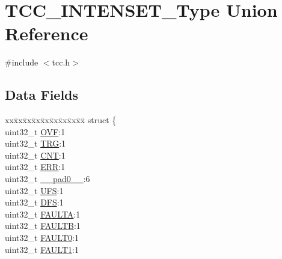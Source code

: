 \hypertarget{union_t_c_c___i_n_t_e_n_s_e_t___type}{}\section{T\+C\+C\+\_\+\+I\+N\+T\+E\+N\+S\+E\+T\+\_\+\+Type Union Reference}
\label{union_t_c_c___i_n_t_e_n_s_e_t___type}


{\ttfamily \#include $<$tcc.\+h$>$}

\subsection*{Data Fields}
\begin{DoxyCompactItemize}
\item 
\begin{tabbing}
xx\=xx\=xx\=xx\=xx\=xx\=xx\=xx\=xx\=\kill
struct \{\\
\>uint32\_t \mbox{\hyperlink{union_t_c_c___i_n_t_e_n_s_e_t___type_ab2e0ce4821f085dd64eac381d127a279}{OVF}}:1\\
\>uint32\_t \mbox{\hyperlink{union_t_c_c___i_n_t_e_n_s_e_t___type_a379eb3005146131648b84a34bee461ba}{TRG}}:1\\
\>uint32\_t \mbox{\hyperlink{union_t_c_c___i_n_t_e_n_s_e_t___type_a6fca6863f3eb037bb9f776358c88d2be}{CNT}}:1\\
\>uint32\_t \mbox{\hyperlink{union_t_c_c___i_n_t_e_n_s_e_t___type_a9d1c4a40e59f012352b155a316d2e65e}{ERR}}:1\\
\>uint32\_t \mbox{\hyperlink{union_t_c_c___i_n_t_e_n_s_e_t___type_a3e57c2ef1c3ffb36722f000cc1156824}{\_\_pad0\_\_}}:6\\
\>uint32\_t \mbox{\hyperlink{union_t_c_c___i_n_t_e_n_s_e_t___type_a1654bab1cafc8412acbb76e3af548f8c}{UFS}}:1\\
\>uint32\_t \mbox{\hyperlink{union_t_c_c___i_n_t_e_n_s_e_t___type_a19b07df6dae8764d8f1f27de4d839308}{DFS}}:1\\
\>uint32\_t \mbox{\hyperlink{union_t_c_c___i_n_t_e_n_s_e_t___type_ac84d9325556a175dc2d3e1b130fd64d2}{FAULTA}}:1\\
\>uint32\_t \mbox{\hyperlink{union_t_c_c___i_n_t_e_n_s_e_t___type_a577317590264c8a0c46f0673ff5e8b19}{FAULTB}}:1\\
\>uint32\_t \mbox{\hyperlink{union_t_c_c___i_n_t_e_n_s_e_t___type_a6b1fb8678950bda06a28a5684ea94c8f}{FAULT0}}:1\\
\>uint32\_t \mbox{\hyperlink{union_t_c_c___i_n_t_e_n_s_e_t___type_a6c5fa32e277485faac1a6b29747666f7}{FAULT1}}:1\\

\end{tabbing}
\end{DoxyCompactItemize}
